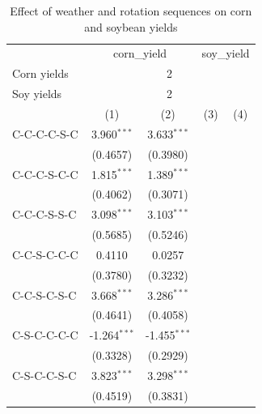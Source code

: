 
\begin{table}[htbp]
   \caption{\label{tab:rot_vpd} Effect of weather and rotation sequences on corn and soybean yields}
   \bigskip
   \centering
   \begin{tabular}{lcccc}
      \toprule
       & \multicolumn{2}{c}{corn\_yield} & \multicolumn{2}{c}{soy\_yield}\\
      Corn yields & \multicolumn{4}{c}{2} \\ 
      Soy yields & \multicolumn{4}{c}{2} \\ 
                                      & (1)            & (2)            & (3)            & (4)\\  
      \midrule 
      C-C-C-C-S-C                     & 3.960$^{***}$  & 3.633$^{***}$  &                &   \\   
                                      & (0.4657)       & (0.3980)       &                &   \\   
      C-C-C-S-C-C                     & 1.815$^{***}$  & 1.389$^{***}$  &                &   \\   
                                      & (0.4062)       & (0.3071)       &                &   \\   
      C-C-C-S-S-C                     & 3.098$^{***}$  & 3.103$^{***}$  &                &   \\   
                                      & (0.5685)       & (0.5246)       &                &   \\   
      C-C-S-C-C-C                     & 0.4110         & 0.0257         &                &   \\   
                                      & (0.3780)       & (0.3232)       &                &   \\   
      C-C-S-C-S-C                     & 3.668$^{***}$  & 3.286$^{***}$  &                &   \\   
                                      & (0.4641)       & (0.4058)       &                &   \\   
      C-S-C-C-C-C                     & -1.264$^{***}$ & -1.455$^{***}$ &                &   \\   
                                      & (0.3328)       & (0.2929)       &                &   \\   
      C-S-C-C-S-C                     & 3.823$^{***}$  & 3.298$^{***}$  &                &   \\   
                                      & (0.4519)       & (0.3831)       &                &   \\   

\end{tabular}
\end{table}

